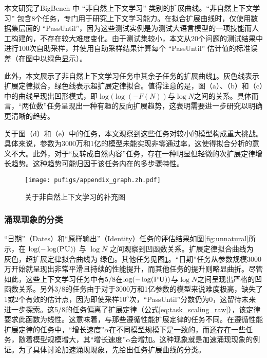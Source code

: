 本文研究了BigBench\citep{srivastava2022beyond} 中 “非自然上下文学习” 类别的扩展曲线。“非自然上下文学习” 包含8个任务，专门用于研究上下文学习能力。在拟合扩展曲线时，仅使用数据集层面的 “PassUntil”，因为这些测试实例是为测试大语言模型的一项技能而人工构建的，不存在较大难度变化。由于测试集较小，本文从20个问题的测试结果中进行100次自助采样，并使用自助采样结果计算每个 “PassUntil” 估计值的标准误差（在图中以绿色显示）。 

此外，本文展示了非自然上下文学习任务中其余子任务的扩展曲线\ref{fig:appendix_unnatural}。灰色线表示扩展定律拟合，绿色线表示超扩展定律拟合。值得注意的是，图（a）、（b）和（c）中的曲线呈现出凹形模式，即\(\log(\log(-F(N))\)与\(\log N\)之间的关系。具体而言，“两位数”任务呈现出一种有趣的反向扩展趋势，这表明需要进一步研究以明确更清晰的趋势。

{
关于图（d）和（e）中的任务，本文观察到这些任务对较小的模型构成重大挑战。具体来说，参数为3000万和1亿的模型未能实现非零通过率，这使得拟合分析的意义不大。此外，对于“反转成自然内容”任务，存在一种明显但轻微的次扩展定律增长趋势。这种趋势可能归因于该任务内在的多步骤特性。
}

\begin{figure}[!htbp]
        \centering
        \texttt{[image: pufigs/appendix\_graph.zh.pdf]}
    \caption{{关于非自然上下文学习的补充图}}
    \label{fig:appendix_unnatural}
\end{figure}

\subsubsection{涌现现象的分类}
“日期”（Dates）和“原样输出”（Identity）任务的评估结果如图\ref{fig:unnatural}所示，在 $\operatorname{log}(-\operatorname{log}(\textsc{PU}))$ 与 $\operatorname{log}N$ 之间观察到凹函数关系。扩展定律拟合曲线为 {\color[rgb]{0.55, 0.6, 0.6}灰色}，超扩展定律拟合曲线为 {\color[rgb]{0.3, 0.6, 0.45}绿色}。其他任务见图\ref{fig:appendix_unnatural}。“日期”任务从参数规模3000万开始就呈现出非常平滑且持续的性能提升，而其他任务的提升则略显曲折。尽管如此，这些上下文学习任务中有5/8在\(\log(-\log(\textsc{PU}))\)与\(\log N\)之间呈现出严格的凹函数关系。另外3/8的任务由于对于3000万和1亿参数的模型来说难度极高，缺失了1或2个有效的估计点，因为即使采样\(10^5\)次，“PassUntil”分数仍为0，这留待未来进一步探索。这5/8的任务偏离了扩展定律（公式\ref{eq:task_scaling_raw}），该定律要求此函数为线性。这意味着，与那些遵循性能扩展定律的任务不同。在遵循性能扩展定律的任务中，“增长速度”\(\alpha\)在不同模型规模下是一致的，而还存在一些任务，随着模型规模增大，其“增长速度”\(\alpha\)会增加。这种现象就是加速涌现现象的例证。为了具体讨论加速涌现现象，先给出任务扩展曲线的分类。

